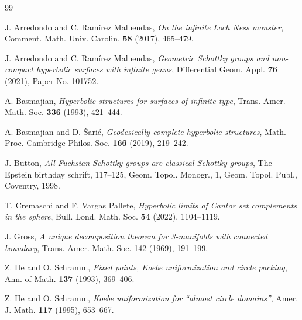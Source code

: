 \documentclass[12pt]{amsart}
\theoremstyle{plain}
\begin{document}
%
\begin{thebibliography}{99}

J. Arredondo and C. Ram\'irez Maluendas,
{\it On the infinite Loch Ness monster},
Comment. Math. Univ. Carolin. {\bf 58} (2017), 465--479.

J. Arredondo and C. Ram\'irez Maluendas,
{\it Geometric Schottky groups and non-compact hyperbolic surfaces with infinite genus}, 
Differential Geom. Appl. {\bf 76} (2021), Paper No. 101752.

 A. Basmajian,
{\it Hyperbolic structures for surfaces of infinite type}, 
Trans. Amer. Math. Soc. {\bf 336} (1993), 421--444.

 A. Basmajian and D. \v{S}ari\'{c},
{\it Geodesically complete hyperbolic structures}, 
Math. Proc. Cambridge Philos. Soc. {\bf 166} (2019), 219--242.


 J. Button, {\it All Fuchsian Schottky groups are classical Schottky groups}, 
The Epstein birthday schrift, 117--125, Geom. Topol. Monogr., 1, Geom. Topol. Publ., Coventry, 1998. 

 T. Cremaschi and F. Vargas Pallete, {\it Hyperbolic limits of Cantor set complements in the sphere}, 
Bull. Lond. Math. Soc. {\bf 54} (2022), 1104--1119. 

 J. Gross, {\it A unique decomposition theorem for 3-manifolds with connected boundary}, 
Trans. Amer. Math. Soc. 142 (1969), 191--199. 


Z. He and O. Schramm,
{\it Fixed points, Koebe uniformization and circle packing}, 
Ann. of Math. {\bf 137} (1993), 369--406.

Z. He and O. Schramm,
{\it Koebe uniformization for ``almost circle domains''}, 
Amer. J. Math. {\bf 117} (1995), 653--667. 


\end{thebibliography}
\end{document}
